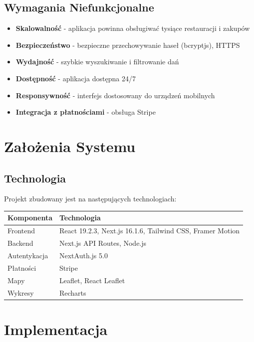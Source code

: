 ﻿\documentclass[12pt,a4paper,utf-8]{article}
\begin{document}
\subsection{Wymagania Niefunkcjonalne}

\begin{itemize}
    \item \textbf{Skalowalność} - aplikacja powinna obsługiwać tysiące restauracji i zakupów
    \item \textbf{Bezpieczeństwo} - bezpieczne przechowywanie haseł (bcryptjs), HTTPS
    \item \textbf{Wydajność} - szybkie wyszukiwanie i filtrowanie dań
    \item \textbf{Dostępność} - aplikacja dostępna 24/7
    \item \textbf{Responsywność} - interfejs dostosowany do urządzeń mobilnych
    \item \textbf{Integracja z płatnościami}  -  obsługa Stripe
\end{itemize}

\newpage

\section{Założenia Systemu}

\subsection{Technologia}

Projekt zbudowany jest na następujących technologiach:

\begin{tabularx}{\textwidth}{|l|X|}
    \hline
    \textbf{Komponenta} & \textbf{Technologia} \\
    \hline
    Frontend & React 19.2.3, Next.js 16.1.6, Tailwind CSS, Framer Motion \\
    \hline
    Backend & Next.js API Routes, Node.js \\
    \hline
    Autentykacja & NextAuth.js 5.0 \\
    \hline
    Płatności & Stripe \\
    \hline
    Mapy & Leaflet, React Leaflet \\
    \hline
    Wykresy & Recharts \\
    \hline
\end{tabularx}

\newpage

\section{Implementacja}
\end{document}
